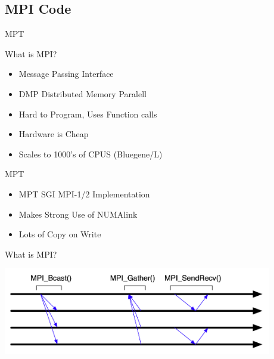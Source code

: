 \documentclass{beamer}
\begin{document}
\subsection{MPI Code}
\begin{frame}{MPT}
  \begin{block}{What is MPI?}
   \begin{itemize}
    \item <1->Message Passing Interface
    \item <2->DMP Distributed Memory Paralell
    \item <3->Hard to Program, Uses Function calls
    \item <4->Hardware is Cheap
    \item <5->Scales to 1000's of CPUS (Bluegene/L)
   \end{itemize}
  \end{block}
  \begin{block}{MPT}
   \begin{itemize}
    \item <6-> MPT SGI MPI-1/2 Implementation
    \item <7-> Makes Strong Use of NUMAlink
    \item <8-> Lots of Copy on Write
   \end{itemize}
  \end{block}
\end{frame}

\begin{frame}{What is MPI?}
   \begin{center}\includegraphics[height=1.5in]{mpi}\end{center}
\end{frame}
\end{document}
